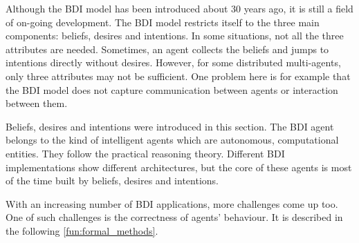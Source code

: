 Although the BDI model has been introduced about 30 years ago, it is still a field of on-going development.
The BDI model restricts itself to the three main components: beliefs, desires and intentions.
In some situations, not all the three attributes are needed.
Sometimes, an agent collects the beliefs and jumps to intentions directly without desires.%
However, for some distributed multi-agents, only three attributes may not be sufficient.
One problem here is for example that the BDI model does not capture communication between agents or interaction between them.

Beliefs, desires and intentions were introduced in this section.
The BDI agent belongs to the kind of intelligent agents which are autonomous, computational entities.
They follow the practical reasoning theory.
Different BDI implementations show different architectures, but the core of these agents is most of the time built by beliefs, desires and intentions.

With an increasing number of BDI applications, more challenges come up too.
One of such challenges is the correctness of agents' behaviour.
It is described in the following \autoref{fun:formal_methods}.
